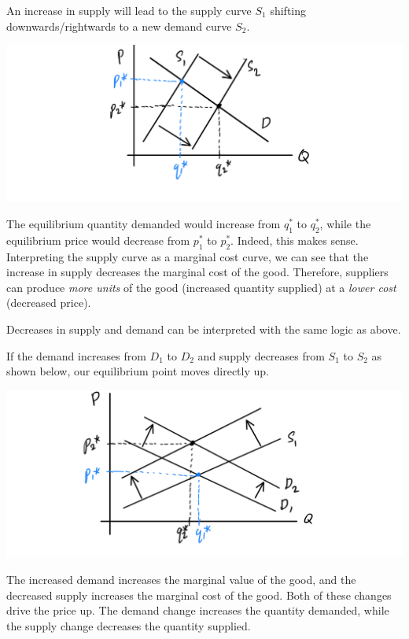 \documentclass{article}
\begin{document}
    \begin{definition}
      An increase in supply will lead to the supply curve $S_1$ shifting downwards/rightwards to a new demand curve $S_2$. 
      \begin{center}
        \includegraphics[scale=0.25]{img/Supply_I.PNG}
      \end{center}
      The equilibrium quantity demanded would increase from $q_1^*$ to $q_2^*$, while the equilibrium price would decrease from $p_1^*$ to $p_2^*$. Indeed, this makes sense. Interpreting the supply curve as a marginal cost curve, we can see that the increase in supply decreases the marginal cost of the good. Therefore, suppliers can produce \textit{more units} of the good (increased quantity supplied) at a \textit{lower cost} (decreased price). 
    \end{definition}

    Decreases in supply and demand can be interpreted with the same logic as above. 

    \begin{example}
      If the demand increases from $D_1$ to $D_2$ and supply decreases from $S_1$ to $S_2$ as shown below, our equilibrium point moves directly up. 
      \begin{center}
        \includegraphics[scale=0.25]{img/Demand_I_Supply_D.PNG}
      \end{center}
      The increased demand increases the marginal value of the good, and the decreased supply increases the marginal cost of the good. Both of these changes drive the price up. The demand change increases the quantity demanded, while the supply change decreases the quantity supplied. 
    \end{example}
\end{document}
